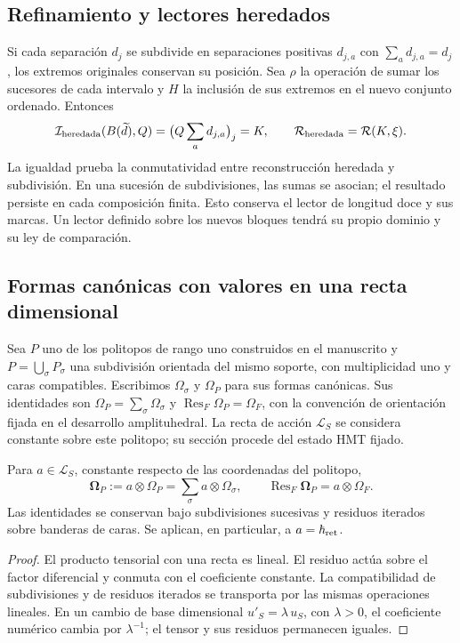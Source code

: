 \subsection{Refinamiento y lectores heredados}

Si cada separación \(d_j\) se subdivide en separaciones positivas
\(d_{j,a}\) con \(\sum_ad_{j,a}=d_j\), los extremos originales
conservan su posición. Sea \(\rho\) la operación de sumar los sucesores
de cada intervalo y \(H\) la inclusión de sus extremos en el nuevo
conjunto ordenado. Entonces
\[
 \mathcal I_{\rm heredada}(B(\widetilde d),Q)
 =\bigl(Q\sum_ad_{j,a}\bigr)_j=K,
 \qquad
 \mathcal R_{\rm heredada}=\mathcal R(K,\xi).
\]
La igualdad prueba la conmutatividad entre reconstrucción heredada y
subdivisión. En una sucesión de subdivisiones, las sumas se asocian;
el resultado persiste en cada composición finita. Esto conserva el
lector de longitud doce y sus marcas. Un lector definido sobre los
nuevos bloques tendrá su propio dominio y su ley de comparación.

\subsection{Formas canónicas con valores en una recta dimensional}

Sea \(P\) uno de los politopos de rango uno construidos en el
manuscrito y \(P=\bigcup_\sigma P_\sigma\) una subdivisión
orientada del mismo soporte, con multiplicidad uno y caras compatibles.
Escribimos \(\Omega_\sigma\) y \(\Omega_P\) para sus formas
canónicas. Sus identidades son
\(\Omega_P=\sum_\sigma\Omega_\sigma\) y
\(\operatorname{Res}_F\Omega_P=\Omega_F\), con la convención
de orientación fijada en el desarrollo amplituhedral.
La recta de acción \(\mathcal L_S\) se considera constante sobre
este politopo; su sección procede del estado HMT fijado.

\begin{theorem}
\label{thm:compat-forma-accion}
Para \(a\in\mathcal L_S\), constante respecto de las coordenadas
del politopo,
\[
 \boldsymbol\Omega_P:=a\otimes\Omega_P
 =\sum_\sigma a\otimes\Omega_\sigma,
 \qquad
 \operatorname{Res}_F\boldsymbol\Omega_P=a\otimes\Omega_F.
\]
Las identidades se conservan bajo subdivisiones sucesivas y residuos
iterados sobre banderas de caras. Se aplican, en particular, a
\(a=\hbar_{\rm ret}\).
\end{theorem}
\begin{proof}
El producto tensorial con una recta es lineal. El residuo actúa sobre
el factor diferencial y conmuta con el coeficiente constante. La
compatibilidad de subdivisiones y de residuos iterados se transporta
por las mismas operaciones lineales. En un cambio de base dimensional
\(u'_S=\lambda\,u_S\), con \(\lambda>0\), el coeficiente numérico
cambia por \(\lambda^{-1}\);
el tensor y sus residuos permanecen iguales.
\end{proof}

